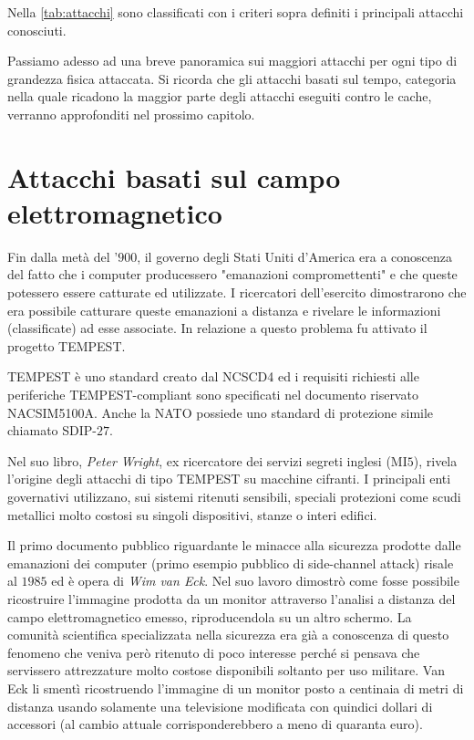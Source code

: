 			Nella \cref{tab:attacchi} sono classificati con i criteri sopra definiti i principali attacchi conosciuti.
			
			Passiamo adesso ad una breve panoramica sui maggiori attacchi per ogni tipo di grandezza fisica attaccata. Si ricorda che gli attacchi basati sul tempo, categoria nella quale ricadono la maggior parte degli attacchi eseguiti contro le cache, verranno approfonditi nel prossimo capitolo.
			
	\section{Attacchi basati sul campo elettromagnetico}
		Fin dalla metà del '$900$, il governo degli Stati Uniti d'America era a conoscenza del fatto che i computer producessero "emanazioni compromettenti" e che queste potessero essere catturate ed utilizzate. I ricercatori dell'esercito dimostrarono che era possibile catturare queste emanazioni a distanza e rivelare le informazioni (classificate) ad esse associate. In relazione a questo problema fu attivato il progetto \ac{TEMPEST}.
		
		TEMPEST è uno standard creato dal \ac{NCSCD4} ed i requisiti richiesti alle periferiche TEMPEST-compliant sono specificati nel documento riservato NACSIM5100A. Anche la \ac{NATO} possiede uno standard di protezione simile chiamato SDIP-$27$.
		
		Nel suo libro\cite{wright1987spycatcher}, \emph{Peter Wright}, ex ricercatore dei servizi segreti inglesi (MI$5$), rivela l'origine degli attacchi di tipo TEMPEST su macchine cifranti. I principali enti governativi utilizzano, sui sistemi ritenuti sensibili, speciali protezioni come scudi metallici molto costosi su singoli dispositivi, stanze o interi edifici\cite{herndon1990electromagnetic}.
		
		Il primo documento pubblico riguardante le minacce alla sicurezza prodotte dalle emanazioni dei computer (primo esempio pubblico di side-channel attack) risale al $1985$ ed è opera di \emph{Wim van Eck}\cite{van1985electromagn}. Nel suo lavoro dimostrò come fosse possibile ricostruire l'immagine prodotta da un monitor attraverso l'analisi a distanza del campo elettromagnetico emesso, riproducendola su un altro schermo. La comunità scientifica specializzata nella sicurezza era già a conoscenza di questo fenomeno che veniva però ritenuto di poco interesse perché si pensava che servissero attrezzature molto costose disponibili soltanto per uso militare. Van Eck li smentì ricostruendo l'immagine di un monitor posto a centinaia di metri di distanza usando solamente una televisione modificata con quindici dollari di accessori (al cambio attuale corrisponderebbero a meno di quaranta euro).
		
